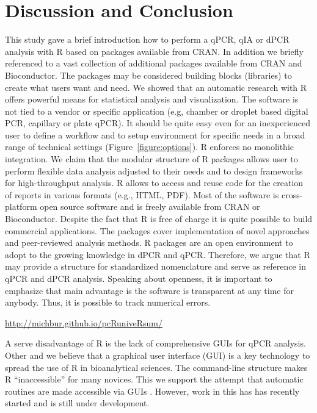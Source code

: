 \section{Discussion and Conclusion}

This study gave a brief introduction how to perform a qPCR, qIA or dPCR analysis 
with R based on packages available from CRAN. In addition we briefly referenced 
to a vast collection of additional packages available from CRAN and 
Bioconductor. The packages may be considered building blocks (libraries) to 
create what users want and need. We showed that an automatic research with R 
offers powerful means for statistical analysis and visualization. The software 
is not tied to a vendor or specific application (e.g, chamber or droplet based 
digital PCR, capillary or plate qPCR). It should be quite easy even for an 
inexperienced user to define a workflow and to setup environment for specific 
needs in a broad range of technical settings (Figure~\ref{figure:options}). R 
enforces no monolithic integration. We claim that the modular structure of R 
packages allows user to perform flexible data analysis adjusted to their needs 
and to design frameworks for high-throughput analysis. R allows to access and 
reuse code for the creation of reports in various formats (e.g., HTML, PDF). 
Most of the software is cross-platform open source software and is freely 
available from CRAN or Bioconductor. Despite the fact that R is free of charge 
it is quite possible to build commercial applications. The packages cover 
implementation of novel approaches and peer-reviewed analysis methods. R 
packages are an open environment to adopt to the growing knowledge in dPCR and 
qPCR. Therefore, we argue that R may provide a structure for standardized 
nomenclature and serve as reference in qPCR and dPCR analysis. Speaking about 
openness, it is important to emphasize that main advantage is the software is 
transparent at any time for anybody. Thus, it is possible to track numerical 
errors. 

\url{http://michbur.github.io/pcRuniveRsum/}

A serve disadvantage of R is the lack of comprehensive GUIs for qPCR analysis. 
Other and we believe that a graphical user interface (GUI) is a key technology 
to spread the use of R in bioanalytical sciences. The command-line structure 
makes R ``inaccessible'' for many novices. This we support the attempt that 
automatic routines are made accessible via GUIs \citep{rodiger_rkward_2012}. 
However, work in this has has recently started and is still under development.

